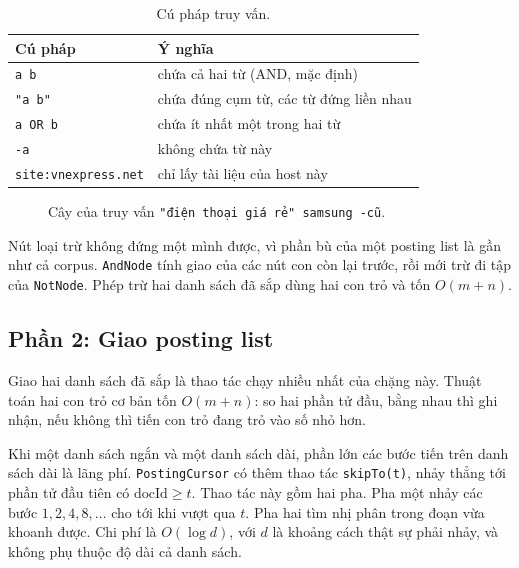 \documentclass[9pt,twocolumn,a4paper]{extarticle}
\newcommand{\code}[1]{\texttt{#1}}
\begin{document}
\begin{table}[H]
\centering
\caption{Cú pháp truy vấn.}
\label{tab:syntax}
\footnotesize
\begin{tabular}{@{}p{2.6cm}p{5.0cm}@{}}
\toprule
Cú pháp & Ý nghĩa \\
\midrule
\code{a b} & chứa cả hai từ (AND, mặc định) \\
\code{"a b"} & chứa đúng cụm từ, các từ đứng liền nhau \\
\code{a OR b} & chứa ít nhất một trong hai từ \\
\code{-a} & không chứa từ này \\
\code{site:vnexpress.net} & chỉ lấy tài liệu của host này \\
\bottomrule
\end{tabular}
\end{table}

\begin{figure}[H]
\centering
{}
\caption{Cây của truy vấn \code{"điện thoại giá rẻ" samsung -cũ}.}
\label{fig:ast}
\end{figure}

Nút loại trừ không đứng một mình được, vì phần bù của một posting list là gần như cả corpus. \code{AndNode} tính giao của các nút con còn lại trước, rồi mới trừ đi tập của \code{NotNode}. Phép trừ hai danh sách đã sắp dùng hai con trỏ và tốn $O(m+n)$.

\subsection{Phần 2: Giao posting list}
\label{sec:merge}
Giao hai danh sách đã sắp là thao tác chạy nhiều nhất của chặng này. Thuật toán hai con trỏ cơ bản tốn $O(m+n)$: so hai phần tử đầu, bằng nhau thì ghi nhận, nếu không thì tiến con trỏ đang trỏ vào số nhỏ hơn.

Khi một danh sách ngắn và một danh sách dài, phần lớn các bước tiến trên danh sách dài là lãng phí. \code{PostingCursor} có thêm thao tác \code{skipTo(t)}, nhảy thẳng tới phần tử đầu tiên có $\text{docId}\ge t$. Thao tác này gồm hai pha. Pha một nhảy các bước $1,2,4,8,\dots$ cho tới khi vượt qua $t$. Pha hai tìm nhị phân trong đoạn vừa khoanh được. Chi phí là $O(\log d)$, với $d$ là khoảng cách thật sự phải nhảy, và không phụ thuộc độ dài cả danh sách.
\end{document}

